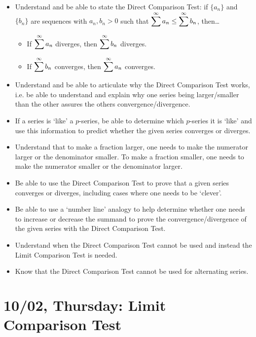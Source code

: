 \documentclass[11pt,letterpaper]{article}
\begin{document}
\begin{itemize}
\item Understand and be able to state the Direct Comparison Test: if $\{ a_n \}$ and $\{ b_n \}$ are sequences with $a_n, b_n > 0$ such that $\displaystyle\sum^\infty a_n \leq \sum^\infty b_n$, then\dots
	\begin{itemize}
	\item If $\displaystyle\sum^\infty a_n$ diverges, then $\displaystyle\sum^\infty b_n$ diverges. 
	\item If $\displaystyle\sum^\infty b_n$ converges, then $\displaystyle\sum^\infty a_n$ converges.
	\end{itemize}

\item Understand and be able to articulate why the Direct Comparison Test works, i.e. be able to understand and explain why one series being larger/smaller than the other assures the others convergence/divergence. 

\item If a series is `like' a $p$-series, be able to determine which $p$-series it is `like' and use this information to predict whether the given series converges or diverges.

\item Understand that to make a fraction larger, one needs to make the numerator larger or the denominator smaller. To make a fraction smaller, one needs to make the numerator smaller or the denominator larger. 

\item Be able to use the Direct Comparison Test to prove that a given series converges or diverges, including cases where one needs to be `clever'.

\item Be able to use a `number line' analogy to help determine whether one needs to increase or decrease the summand to prove the convergence/divergence of the given series with the Direct Comparison Test. 

\item Understand when the Direct Comparison Test cannot be used and instead the Limit Comparison Test is needed. 

\item Know that the Direct Comparison Test cannot be used for alternating series. 
\end{itemize}

\newpage
\section*{10/02, Thursday: Limit Comparison Test\label{10-02}}
\end{document}
